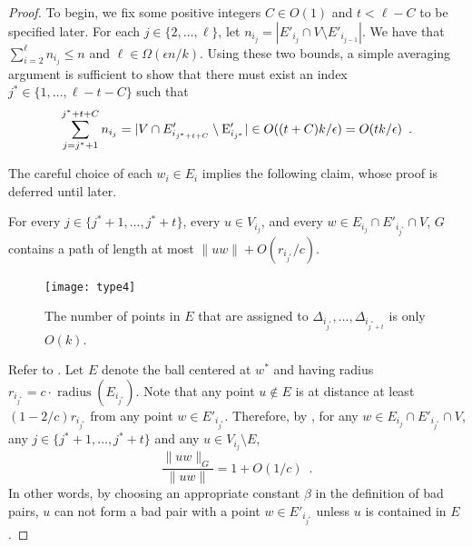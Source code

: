\documentclass{patmorin}
\DeclareMathOperator{\radius}{radius}
\begin{document}
\begin{proof}
  To begin, we fix some positive integers $C\in O(1)$ and $t< \ell
  - C$ to be specified later.  For each $j\in\{2,\ldots,\ell\}$,
  let $n_{i_j}=|E'_{i_j}\cap V\setminus E'_{i_{j-1}}|$. We have that
  $\sum_{i=2}^{\ell} n_{i_j} \le n$ and $\ell \in\Omega(\epsilon n/k)$.
  Using these two bounds, a simple averaging argument is sufficient
  to show that there must exist an index $j^*\in\{1,\ldots,\ell-t-C\}$
  such that
  \begin{equation}
     \sum_{j=j^*+1}^{j^*+t+C} n_{i_j}
        = |V\cap E'_{i_{j^*+t+C}}\setminus \E'_{i_{j^*}}| 
          \in O((t+C)k/\epsilon)
          = O(tk/\epsilon) \enspace . \eqlabel{sparse}
  \end{equation}

  The careful choice of each $w_i\in E_i$ implies the following claim,
  whose proof is deferred until later.
  \begin{clm}
    For every $j\in\{j^*+1,\ldots,j^*+t\}$, every $u\in V_{i_j}$, and
    every $w\in E_{i_j}\cap E'_{i_{j^*}}\cap V$, $G$ contains a path of
    length at most $\|uw\|+O(r_{i_{j^*}}/c)$.
  \end{clm}

  \begin{figure}
    \begin{center}
      \texttt{[image: type4]}
    \end{center}
    \caption{The number of points in $E$ that are assigned to
      $\Delta_{i_{j^*}},\ldots,\Delta_{i_{j^*+t}}$
      is only $O(k)$.}
  \end{figure}

  Refer to .  Let $E$ denote the ball centered at $w^*$
  and having radius $r_{i_{j^*}}=c\cdot\radius(E_{i_{j^*}})$.  Note that
  any point $u\not\in E$ is at distance at least $(1-2/c)r_{i_{j^*}}$ from
  any point $w\in E'_{i_{j^*}}$.  Therefore, by , for any
  $w\in E_{i_j}\cap E'_{i_{j^*}}\cap V$, any $j\in\{j^*+1,\ldots,j^*+t\}$
  and any $u\in V_{i_{j}}\setminus E$,
  \[  
     \frac{\|uw\|_G}{\|uw\|} = 1+O(1/c) \enspace . 
  \]
  In other words, by choosing an appropriate constant $\beta$ in the
  definition of bad pairs, $u$ can not form a bad pair with a point
  $w\in E'_{i_{j^*}}$ unless $u$ is contained in $E$.



\end{proof}
\end{document}
